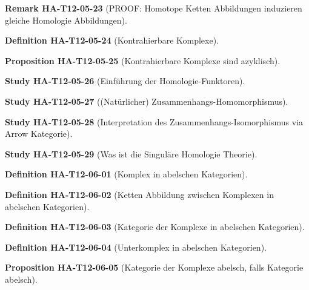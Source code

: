\documentclass[10pt, letterpaper]{article}
\newcommand{\CustomHeading}[3]{%
  \par\medskip\noindent%
  \textbf{#1 #2} \textnormal{(#3)}.\enskip%
}
\newenvironment{DEF}[2]{\CustomHeading{Definition}{#1}{#2}}{}
\newenvironment{PROP}[2]{\CustomHeading{Proposition}{#1}{#2}}{}
\newenvironment{REM}[2]{\CustomHeading{Remark}{#1}{#2}}{}
\newenvironment{STUD}[2]{\CustomHeading{Study}{#1}{#2}}{}
\begin{document}
\begin{REM}{HA-T12-05-23}{PROOF: Homotope Ketten Abbildungen induzieren gleiche Homologie Abbildungen}
\end{REM}

\begin{DEF}{HA-T12-05-24}{Kontrahierbare Komplexe}
\end{DEF}

\begin{PROP}{HA-T12-05-25}{Kontrahierbare Komplexe sind azyklisch}
\end{PROP}

\begin{STUD}{HA-T12-05-26}{Einführung der Homologie-Funktoren}
\end{STUD}

\begin{STUD}{HA-T12-05-27}{(Natürlicher) Zusammenhangs-Homomorphismus}
\end{STUD}

\begin{STUD}{HA-T12-05-28}{Interpretation des Zusammenhangs-Isomorphismus via Arrow Kategorie}
\end{STUD}

\begin{STUD}{HA-T12-05-29}{Was ist die Singuläre Homologie Theorie}
\end{STUD}

\begin{DEF}{HA-T12-06-01}{Komplex in abelschen Kategorien}
\end{DEF}

\begin{DEF}{HA-T12-06-02}{Ketten Abbildung zwischen Komplexen in abelschen Kategorien}
\end{DEF}

\begin{DEF}{HA-T12-06-03}{Kategorie der Komplexe in abelschen Kategorien}
\end{DEF}

\begin{DEF}{HA-T12-06-04}{Unterkomplex in abelschen Kategorien}
\end{DEF}

\begin{PROP}{HA-T12-06-05}{Kategorie der Komplexe abelsch, falls Kategorie abelsch}
\end{PROP}
\end{document}

